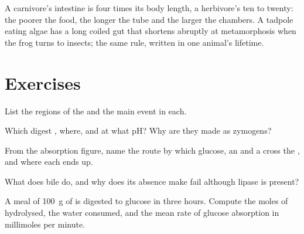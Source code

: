 \begin{remark}\label{rem:b1:digestion-absorption:length}
A carnivore's intestine is four times its body length, a herbivore's
ten to twenty: the poorer the food, the longer the tube and the larger
the chambers. A tadpole eating algae has a long coiled gut that
shortens abruptly at metamorphosis when the frog turns to insects;
the same rule, written in one animal's lifetime.
\end{remark}

\section{Exercises}

\begin{exercise}[$\star$]\label{exo:b1:digestion-absorption:1}
List the regions of the  and the main event in each.
\end{exercise}

\begin{exercise}[$\star$]\label{exo:b1:digestion-absorption:2}
Which  digest , where, and at what pH? Why are they
made as zymogens?
\end{exercise}

\begin{exercise}[$\star$]\label{exo:b1:digestion-absorption:3}
From the absorption figure, name the route by which glucose, an  and a  cross the , and where each ends up.
\end{exercise}

\begin{exercise}[$\star$]\label{exo:b1:digestion-absorption:4}
What does bile do, and why does its absence make   fail
although lipase is present?
\end{exercise}

\begin{exercise}[$\star\star$]\label{exo:b1:digestion-absorption:5}
A meal of \qty{100}{g} of  is digested to glucose in three
hours. Compute the moles of  hydrolysed, the water
consumed, and the mean rate of glucose absorption in millimoles per
minute.
\end{exercise}

